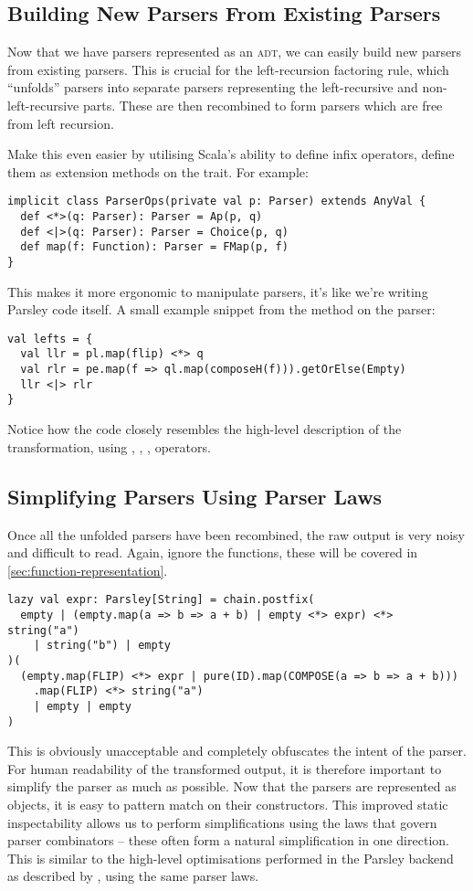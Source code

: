 \documentclass[../../main.tex]{subfiles}
\begin{document}
\subsection{Building New Parsers From Existing Parsers}
Now that we have parsers represented as an \textsc{adt}, we can easily build new parsers from existing parsers.
This is crucial for the left-recursion factoring rule, which ``unfolds'' parsers into separate parsers representing the left-recursive and non-left-recursive parts.
These are then recombined to form parsers which are free from left recursion.

Make this even easier by utilising Scala's ability to define infix operators, define them as extension methods on the  trait.
For example:
\begin{verbatim}
implicit class ParserOps(private val p: Parser) extends AnyVal {
  def <*>(q: Parser): Parser = Ap(p, q)
  def <|>(q: Parser): Parser = Choice(p, q)
  def map(f: Function): Parser = FMap(p, f)
}
\end{verbatim}
%
This makes it more ergonomic to manipulate parsers, it's like we're writing Parsley code itself.
A small example snippet from the  method on the  parser:
\begin{verbatim}
val lefts = {
  val llr = pl.map(flip) <*> q
  val rlr = pe.map(f => ql.map(composeH(f))).getOrElse(Empty)
  llr <|> rlr
}
\end{verbatim}
Notice how the code closely resembles the high-level description of the transformation, using \scala{<*>}, \scala{<|>}, , operators.

\subsection{Simplifying Parsers Using Parser Laws}\label{sec:simplify-parsers}
Once all the unfolded parsers have been recombined, the raw output is very noisy and difficult to read.
Again, ignore the functions, these will be covered in \cref{sec:function-representation}.
\begin{verbatim}
lazy val expr: Parsley[String] = chain.postfix(
  empty | (empty.map(a => b => a + b) | empty <*> expr) <*> string("a")
    | string("b") | empty
)(
  (empty.map(FLIP) <*> expr | pure(ID).map(COMPOSE(a => b => a + b)))
    .map(FLIP) <*> string("a")
    | empty | empty
)
\end{verbatim}
%
This is obviously unacceptable and completely obfuscates the intent of the parser.
For human readability of the transformed output, it is therefore important to simplify the parser as much as possible.
Now that the parsers are represented as objects, it is easy to pattern match on their constructors.
This improved static inspectability allows us to perform simplifications using the laws that govern parser combinators -- these often form a natural simplification in one direction.
This is similar to the high-level optimisations performed in the Parsley backend as described by \textcite{willis_staged_2023}, using the same parser laws.
\end{document}
